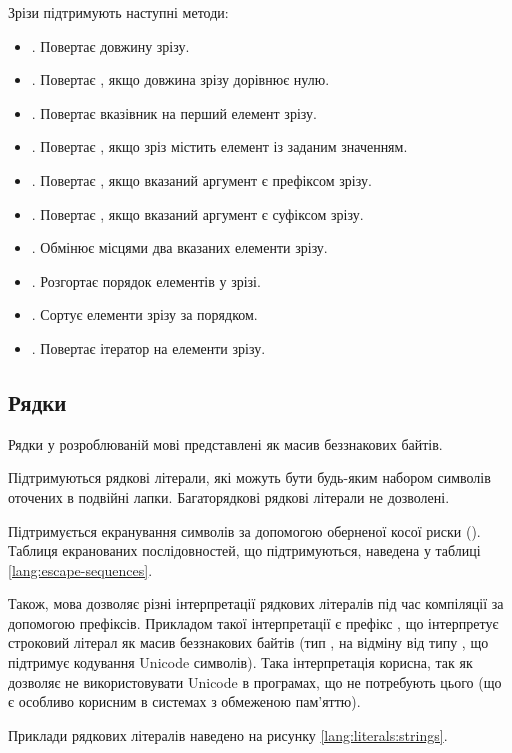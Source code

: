 \documentclass[main.tex]{subfiles}
\begin{document}
Зрізи підтримують наступні методи:
\begin{itemize}
\item {}. Повертає довжину зрізу.
\item {}. Повертає , якщо довжина зрізу дорівнює нулю.
\item {}. Повертає вказівник на перший елемент зрізу.
\item {}. Повертає , якщо зріз містить елемент із заданим значенням.
\item {}. Повертає , якщо вказаний аргумент є префіксом зрізу.
\item {}. Повертає , якщо вказаний аргумент є суфіксом зрізу.
\item {}. Обмінює місцями два вказаних елементи зрізу.
\item {}. Розгортає порядок елементів у зрізі.
\item {}. Сортує елементи зрізу за порядком.
\item {}. Повертає ітератор на елементи зрізу.
\end{itemize}

\FloatBarrier
\subsection{Рядки}
Рядки у розроблюваній мові представлені як масив беззнакових байтів.

Підтримуються рядкові літерали, які можуть бути будь-яким набором символів оточених в подвійні лапки.
Багаторядкові рядкові літерали не дозволені.

Підтримується екранування символів за допомогою оберненої косої риски (\code{\textbackslash}).
Таблиця екранованих послідовностей, що підтримуються, наведена у таблиці \ref{lang:escape-sequences}.

Також, мова дозволяє різні інтерпретації рядкових літералів під час компіляції за допомогою префіксів.
Прикладом такої інтерпретації є префікс , що інтерпретує строковий літерал як масив беззнакових байтів (тип , на відміну від типу , що підтримує кодування Unicode символів).
Така інтерпретація корисна, так як дозволяє не використовувати Unicode в програмах, що не потребують цього (що є особливо корисним в системах з обмеженою пам'яттю).

Приклади рядкових літералів наведено на рисунку \ref{lang:literals:strings}.
\end{document}
